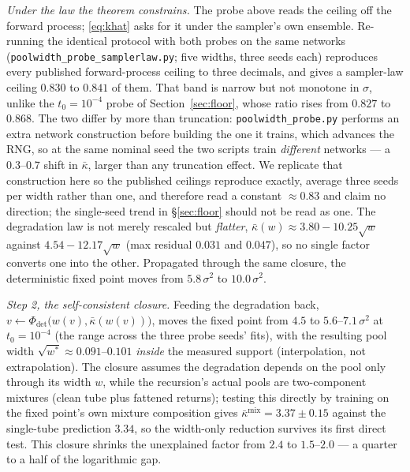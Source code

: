 \documentclass[11pt]{article}
\theoremstyle{remark}
\newcommand{\kb}{\bar\kappa}
\newcommand{\Phidet}{\Phi_{\mathrm{det}}}
\newcommand{\sigsq}{\sigma^2}
\begin{document}
\emph{Under the law the theorem constrains.} The probe above reads the ceiling off the
forward process; \eqref{eq:khat} asks for it under the sampler's own ensemble. Re-running
the identical protocol with both probes on the same networks
(\texttt{poolwidth\_probe\_samplerlaw.py}; five widths, three seeds each) reproduces every
published forward-process ceiling to three decimals, and gives a sampler-law ceiling
$0.830$ to $0.841$ of them. That band is narrow but not monotone in $\sigma$, unlike the
$t_0=10^{-4}$ probe of Section~\ref{sec:floor}, whose ratio rises from $0.827$ to $0.868$.
The two differ by more than truncation: \texttt{poolwidth\_probe.py} performs an extra
network construction before building the one it trains, which advances the RNG, so at the
same nominal seed the two scripts train \emph{different} networks --- a $0.3$--$0.7$ shift
in $\kb$, larger than any truncation effect. We replicate that construction here so the
published ceilings reproduce exactly, average three seeds per width rather than one, and
therefore read a constant ${\approx}0.83$ and claim no direction; the single-seed trend in
\S\ref{sec:floor} should not be read as one. The degradation law is not merely rescaled but
\emph{flatter}, $\kb(w)\approx3.80-10.25\sqrt w$ against $4.54-12.17\sqrt w$ (max residual
$0.031$ and $0.047$), so no single factor converts one into the other. Propagated through
the same closure, the deterministic fixed point moves from $5.8\,\sigsq$ to
$10.0\,\sigsq$.

\emph{Step 2, the self-consistent closure.} Feeding the degradation back,
$v\leftarrow\Phidet\big(w(v),\kb(w(v))\big)$, moves the fixed point from $4.5$ to
$5.6$--$7.1\,\sigsq$ at $t_0=10^{-4}$ (the range across the three probe seeds' fits), with
the resulting pool width $\sqrt{w^*}\approx0.091$--$0.101$ \emph{inside} the measured
support (interpolation, not extrapolation). The closure assumes the degradation depends on
the pool only through its width $w$, while the recursion's actual pools are two-component
mixtures (clean tube plus fattened returns); testing this directly by training on the fixed
point's own mixture composition gives $\kb^{\mathrm{mix}}=3.37\pm0.15$ against the
single-tube prediction $3.34$, so the width-only reduction survives its first direct test.
This closure shrinks the unexplained factor from $2.4$ to $1.5$--$2.0$ --- a quarter to a
half of the logarithmic gap.
\end{document}
